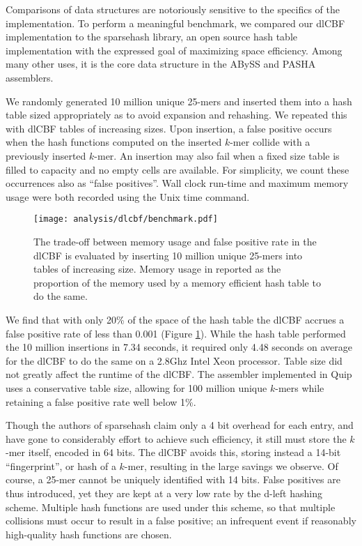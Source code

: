 \documentclass[twocolumn]{article}
\begin{document}
Comparisons of data structures are notoriously sensitive to the
specifics of the implementation. To perform a meaningful benchmark, we
compared our dlCBF implementation to the sparsehash library, an open source
hash table implementation with the expressed goal of maximizing space
efficiency. Among many other uses, it is the core data structure in the ABySS
\citep{Simpson2011} and PASHA \citep{Liu2011} assemblers.

We randomly generated 10 million unique 25-mers and inserted them into a hash
table sized appropriately as to avoid expansion and rehashing. We repeated
this with dlCBF tables of increasing sizes. Upon insertion, a false positive
occurs when the hash functions computed on the inserted $k$-mer collide with a
previously inserted $k$-mer. An insertion may also fail when a fixed size
table is filled to capacity and no empty cells are available. For simplicity,
we count these occurrences also as ``false positives''. Wall clock run-time and maximum memory
usage were both recorded using the Unix time command.

\begin{figure}[h]
\centerline{\texttt{[image: analysis/dlcbf/benchmark.pdf]}}
\caption{
The trade-off between memory usage and false positive rate in the dlCBF is
evaluated by inserting 10 million unique 25-mers into tables of increasing
size. Memory usage in reported as the proportion of the memory used by a
memory efficient hash table to do the same.
}
\label{fig:dlcbf_bench}
\end{figure}

We find that with only 20\% of the space of the hash table the dlCBF accrues a
false positive rate of less than 0.001 (Figure \ref{fig:dlcbf_bench}). While
the hash table performed the 10 million insertions in 7.34 seconds, it
required only 4.48 seconds on average for the dlCBF to do the same on a 2.8Ghz
Intel Xeon processor. Table size did not greatly affect the runtime of the
dlCBF. The assembler implemented in Quip uses a conservative table size,
allowing for 100 million unique $k$-mers while retaining a false positive
rate well below 1\%.

Though the authors of sparsehash claim only a 4 bit overhead for each entry,
and have gone to considerably effort to achieve such efficiency, it still must
store the $k$-mer itself, encoded in 64 bits. The dlCBF avoids this, storing
instead a 14-bit ``fingerprint'', or hash of a $k$-mer, resulting in the large
savings we observe. Of course, a 25-mer cannot be uniquely identified with 14
bits. False positives are thus introduced, yet they are kept at a very low
rate by the d-left hashing scheme. Multiple hash functions are used
under this scheme, so that multiple collisions must occur to result in a false
positive; an infrequent event if reasonably high-quality hash functions are
chosen.
\end{document}
